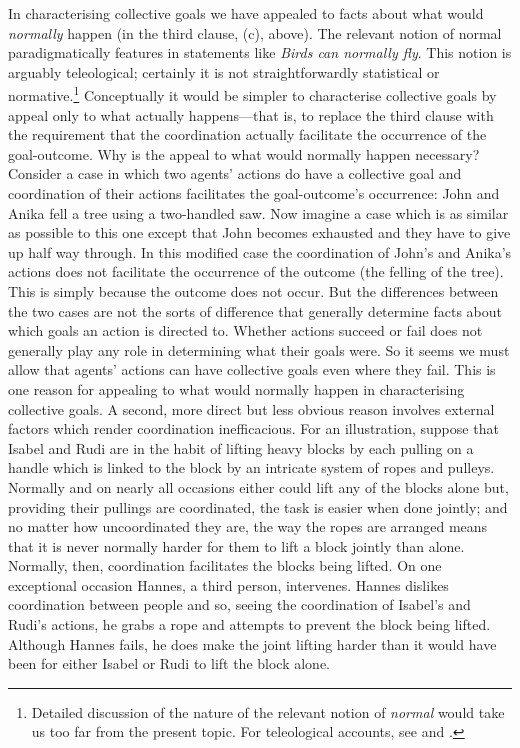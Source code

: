 \documentclass[12pt,a4paper]{extarticle}
\begin{document}
In characterising collective goals we have appealed to facts about what would \emph{normally} happen (in the third clause, (c), above).  
The relevant notion of normal paradigmatically features in statements like \emph{Birds can normally fly}.  
This notion is arguably teleological; certainly it is not  straightforwardly statistical or normative.\footnote{
Detailed discussion of the nature of the relevant notion of  \emph{normal} would take us too far from the present topic.
For teleological accounts, see 
	\citet[p.\ 33ff.]{Millikan:1984ib} and 
	\citet[p.\ 48ff.]{Price:2001hs}.
}
Conceptually it would be simpler to characterise collective goals by appeal only to what actually happens---that is, to replace the third clause with the requirement that the coordination actually facilitate the occurrence of the goal-outcome.  
Why is the appeal to what would normally happen necessary? 
Consider a case in which two agents' actions do have a collective goal and coordination of their actions facilitates the goal-outcome's occurrence: John and Anika fell a tree using a two-handled saw.  
Now imagine a case which is as similar as possible to this one except that John becomes exhausted and they have to give up half way through.  
In this modified case the coordination of John's and Anika's actions does not facilitate the occurrence of the outcome (the felling of the tree).
This is simply because the outcome does not occur.  
But the differences between the two cases are not the sorts of difference that generally determine facts about which goals an action is directed to.  
Whether actions succeed or fail does not generally play any role in determining what their goals were.
So it seems we must allow that agents' actions can have collective goals even where they fail.  
This is one reason for appealing to what would normally happen in characterising collective goals.  
A second, more direct but less obvious reason involves external factors which render coordination inefficacious.  For an illustration, suppose that Isabel and Rudi are in the habit of lifting heavy blocks by each pulling on a handle which is linked to the block by an intricate system of ropes and pulleys.  
Normally and on nearly all occasions either could lift any of the blocks alone but, providing their pullings are coordinated, the task is easier when done jointly;
and no matter how uncoordinated they are, the way the ropes are arranged means that it is never normally harder for them to lift a block jointly than alone.  
Normally, then, coordination facilitates the blocks being lifted.  
On one exceptional occasion Hannes, a third person, intervenes.  Hannes dislikes coordination between people and so, seeing the coordination of Isabel's and Rudi's actions, he grabs a rope and attempts to prevent the block being lifted.  Although Hannes fails, he does make the joint lifting harder than it would have been for either Isabel or Rudi to lift the block alone.  
\end{document}
